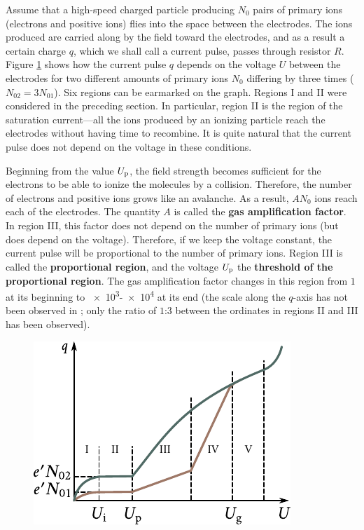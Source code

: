 Assume that a high-speed charged particle producing $N_0$ pairs of primary ions (electrons and positive ions) flies into the space between the electrodes.
The ions produced are carried along by the field toward the electrodes, and as a result a certain charge $q$, which we shall call a current pulse, passes through resistor $R$.
Figure \ref{fig:12_4} shows how the current pulse $q$ depends on the voltage $U$ between the electrodes for two different amounts of primary ions $N_0$ differing by three times ($N_{02} = 3N_{01}$).
Six regions can be earmarked on the graph.
Regions I and II were considered in the preceding section.
In particular, region II is the region of the saturation current---all the ions produced by an ionizing particle reach the electrodes without having
time to recombine.
It is quite natural that the current pulse does not depend on the voltage in these conditions.

Beginning from the value $U_{\text{p}}$, the field strength becomes sufficient for the electrons to be able to ionize the molecules by a collision. Therefore, the number of electrons and positive ions grows like an avalanche.
As a result, $AN_0$ ions reach each of the  electrodes.
The quantity $A$ is called the \textbf{gas amplification factor}.
In region III, this factor does not depend on the number of primary ions (but does depend on the voltage).
Therefore, if we keep the voltage constant, the current pulse will be proportional to the number of primary ions.
Region III is called the \textbf{proportional region}, and the voltage $U_{\text{p}}$ the \textbf{threshold of the proportional region}.
The gas amplification factor changes in this region from $1$ at its beginning to \num{e3}-\num{e4} at its end (the scale along the $q$-axis has not been observed in ; only the ratio of $1$:$3$ between the ordinates in regions II and III has been
observed).

\begin{figure}[t]
	\begin{center}
		\includegraphics[scale=1]{figures/ch_12/fig_12_4.pdf}
		\caption[]{}
		\label{fig:12_4}
	\end{center}
	\vspace{-0.8cm}
\end{figure}

